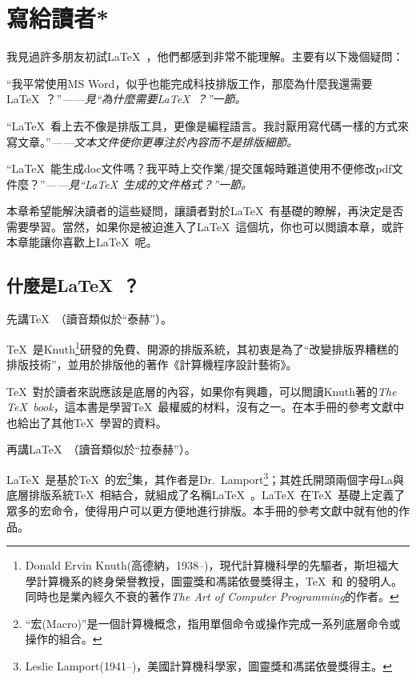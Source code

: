 \chapter{\mbox{寫給讀者}*}

我見過許多朋友初試\LaTeX\ ，他們都感到非常不能理解。主要有以下幾個疑問：
\begin{feae}
\item “我平常使用MS Word，似乎也能完成科技排版工作，那麼為什麼我還需要\LaTeX\ ？”\hfill \textit{——見“為什麼需要\LaTeX\ ？”一節。}
\item “\LaTeX\ 看上去不像是排版工具，更像是編程語言。我討厭用寫代碼一樣的方式來寫文章。”\hfill \textit{——文本文件使你更專注於內容而不是排版細節。}
\item “\LaTeX\ 能生成doc文件嗎？我平時上交作業/提交匯報時難道使用不便修改pdf文件麼？”\hfill \textit{——見“\LaTeX\ 生成的文件格式？”一節。}
\end{feae}

本章希望能解決讀者的這些疑問，讓讀者對於\LaTeX\ 有基礎的瞭解，再決定是否需要學習。當然，如果你是被迫進入了\LaTeX\ 這個坑，你也可以閲讀本章，或許本章能讓你喜歡上\LaTeX\ 呢。

\section{什麼是\LaTeX\ ？}
先講\TeX\ （讀音類似於“泰赫”）。

\TeX\ 是Knuth\footnote{Donald Ervin Knuth(高德納，1938--)，現代計算機科學的先驅者，斯坦福大學計算機系的終身榮譽教授，圖靈獎和馮諾依曼獎得主，\TeX\ 和  的發明人。同時也是業內經久不衰的著作\emph{The Art of Computer Programming}的作者。}研發的免費、開源的排版系統，其初衷是為了“改變排版界糟糕的排版技術”，並用於排版他的著作《計算機程序設計藝術》。

\TeX\ 對於讀者來説應該是底層的內容，如果你有興趣，可以閲讀Knuth著的\emph{The \TeX\ book}，這本書是學習\TeX\ 最權威的材料，沒有之一。在本手冊的參考文獻中也給出了其他\TeX\ 學習的資料。\dpar

再講\LaTeX\ （讀音類似於“拉泰赫”）。

\LaTeX\ 是基於\TeX\ 的宏\footnote{“宏(Macro)”是一個計算機概念，指用單個命令或操作完成一系列底層命令或操作的組合。}集，其作者是Dr.~Lamport\footnote{Leslie Lamport(1941--)，美國計算機科學家，圖靈獎和馮諾依曼獎得主。}；其姓氏開頭兩個字母La與底層排版系統\TeX\ 相結合，就組成了名稱\LaTeX\ 。\LaTeX\ 在\TeX\ 基礎上定義了眾多的宏命令，使得用户可以更方便地進行排版。本手冊的參考文獻中就有他的作品。

